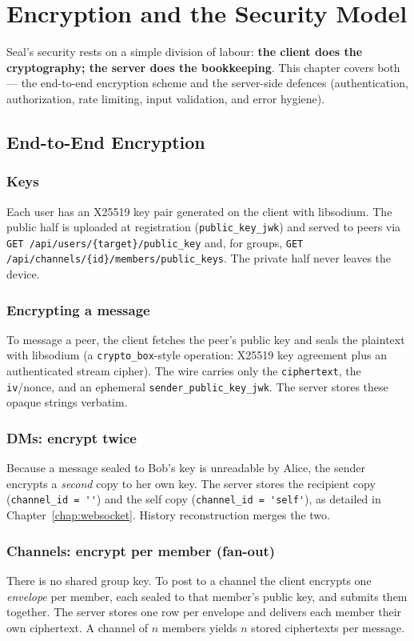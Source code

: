 \chapter{Encryption and the Security Model}
\label{chap:security}

Seal's security rests on a simple division of labour: \textbf{the client does the
cryptography; the server does the bookkeeping}. This chapter covers both --- the
end-to-end encryption scheme and the server-side defences (authentication,
authorization, rate limiting, input validation, and error hygiene).

\section{End-to-End Encryption}

\subsection*{Keys}
Each user has an X25519 key pair generated on the client with libsodium. The
public half is uploaded at registration (\verb|public_key_jwk|) and served to
peers via \verb|GET /api/users/{target}/public_key| and, for groups,
\verb|GET /api/channels/{id}/members/public_keys|. The private half never leaves
the device.

\subsection*{Encrypting a message}
To message a peer, the client fetches the peer's public key and seals the
plaintext with libsodium (a \verb|crypto_box|-style operation: X25519 key
agreement plus an authenticated stream cipher). The wire carries only the
\verb|ciphertext|, the \verb|iv|/nonce, and an ephemeral
\verb|sender_public_key_jwk|. The server stores these opaque strings verbatim.

\subsection*{DMs: encrypt twice}
Because a message sealed to Bob's key is unreadable by Alice, the sender encrypts
a \emph{second} copy to her own key. The server stores the recipient copy
(\verb|channel_id = ''|) and the self copy (\verb|channel_id = 'self'|), as
detailed in Chapter~\ref{chap:websocket}. History reconstruction merges the two.

\subsection*{Channels: encrypt per member (fan-out)}
There is no shared group key. To post to a channel the client encrypts one
\emph{envelope} per member, each sealed to that member's public key, and submits
them together. The server stores one row per envelope and delivers each member
their own ciphertext. A channel of $n$ members yields $n$ stored ciphertexts per
message.

